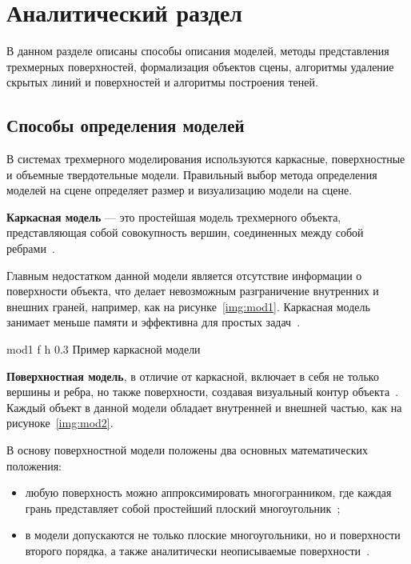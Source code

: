 \chapter{Аналитический раздел}

В данном разделе описаны способы описания моделей, методы представления трехмерных поверхностей, формализация объектов сцены, алгоритмы удаление скрытых линий и поверхностей и алгоритмы построения теней.

\section{Способы определения моделей}

В системах трехмерного моделирования используются каркасные, поверхностные и объемные твердотельные модели. 
Правильный выбор метода определения моделей на сцене определяет размер и визуализацию модели на сцене.

\textbf{Каркасная модель} --- это простейшая модель трехмерного объекта, представляющая собой совокупность вершин, соединенных между собой ребрами~\cite{model_geom}.

Главным недостатком данной модели является отсутствие информации о поверхности объекта, что делает невозможным разграничение внутренних и внешних граней, например, как на рисунке~\ref{img:mod1}.
Каркасная модель занимает меньше памяти и эффективна для простых задач~\cite{model_geom_01}.
 

	{mod1} %
	{f} %
	{h} %
	{0.3\textwidth} %
	{Пример каркасной модели} %
	

\textbf{Поверхностная модель}, в отличие от каркасной, включает в себя не только вершины и ребра, но также поверхности, создавая визуальный контур объекта~\cite{model_geom}. Каждый объект в данной модели обладает внутренней и внешней частью, как на  рисуноке~\ref{img:mod2}.

В основу поверхностной модели положены два основных математических положения:
\begin{itemize}
	\item любую поверхность можно аппроксимировать многогранником, где каждая грань представляет собой простейший плоский многоугольник~\cite{model_geom_01};
	\item в модели допускаются не только плоские многоугольники, но и поверхности второго порядка, а также аналитически неописываемые поверхности~\cite{model_geom_01}.
\end{itemize}

